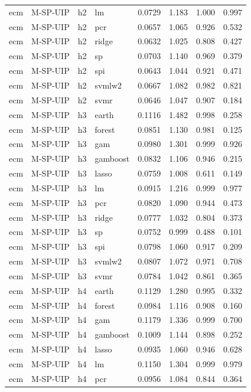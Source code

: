 \begin{ThreePartTable}
\begin{longtable}[t]{llclcccc}
ecm & M-SP-UIP & h2 & lm & 0.0729 & 1.183 & 1.000 & 0.997\\
ecm & M-SP-UIP & h2 & pcr & 0.0657 & 1.065 & 0.926 & 0.532\\
ecm & M-SP-UIP & h2 & ridge & 0.0632 & 1.025 & 0.808 & 0.427\\
ecm & M-SP-UIP & h2 & sp & 0.0703 & 1.140 & 0.969 & 0.379\\
ecm & M-SP-UIP & h2 & spi & 0.0643 & 1.044 & 0.921 & 0.471\\
ecm & M-SP-UIP & h2 & svmlw2 & 0.0667 & 1.082 & 0.982 & 0.821\\
ecm & M-SP-UIP & h2 & svmr & 0.0646 & 1.047 & 0.907 & 0.184\\
\addlinespace
ecm & M-SP-UIP & h3 & earth & 0.1116 & 1.482 & 0.998 & 0.258\\
ecm & M-SP-UIP & h3 & forest & 0.0851 & 1.130 & 0.981 & 0.125\\
ecm & M-SP-UIP & h3 & gam & 0.0980 & 1.301 & 0.999 & 0.926\\
ecm & M-SP-UIP & h3 & gamboost & 0.0832 & 1.106 & 0.946 & 0.215\\
ecm & M-SP-UIP & h3 & lasso & 0.0759 & 1.008 & 0.611 & 0.149\\
ecm & M-SP-UIP & h3 & lm & 0.0915 & 1.216 & 0.999 & 0.977\\
ecm & M-SP-UIP & h3 & pcr & 0.0820 & 1.090 & 0.944 & 0.473\\
ecm & M-SP-UIP & h3 & ridge & 0.0777 & 1.032 & 0.804 & 0.373\\
ecm & M-SP-UIP & h3 & sp & 0.0752 & 0.999 & 0.488 & 0.101\\
ecm & M-SP-UIP & h3 & spi & 0.0798 & 1.060 & 0.917 & 0.209\\
ecm & M-SP-UIP & h3 & svmlw2 & 0.0807 & 1.072 & 0.971 & 0.708\\
ecm & M-SP-UIP & h3 & svmr & 0.0784 & 1.042 & 0.861 & 0.365\\
\addlinespace
ecm & M-SP-UIP & h4 & earth & 0.1129 & 1.280 & 0.995 & 0.332\\
ecm & M-SP-UIP & h4 & forest & 0.0984 & 1.116 & 0.908 & 0.160\\
ecm & M-SP-UIP & h4 & gam & 0.1179 & 1.336 & 0.999 & 0.700\\
ecm & M-SP-UIP & h4 & gamboost & 0.1009 & 1.144 & 0.898 & 0.252\\
ecm & M-SP-UIP & h4 & lasso & 0.0935 & 1.060 & 0.946 & 0.628\\
ecm & M-SP-UIP & h4 & lm & 0.1150 & 1.304 & 0.999 & 0.979\\
ecm & M-SP-UIP & h4 & pcr & 0.0956 & 1.084 & 0.844 & 0.364\\

\end{longtable}
\end{ThreePartTable}
